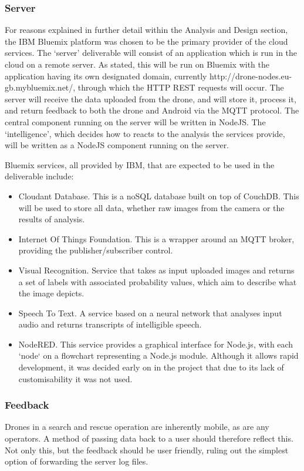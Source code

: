 \documentclass{article}
\begin{document}
\subsubsection{Server}
For reasons explained in further detail within the Analysis and Design section, the IBM Bluemix platform was chosen to be the primary provider of the cloud services. The `server' deliverable will consist of an application which is run in the cloud on a remote server. As stated, this will be run on Bluemix with the application having its own designated domain, currently http://drone-nodes.eu-gb.mybluemix.net/, through which the HTTP REST requests will occur. The server will receive the data uploaded from the drone, and will store it, process it, and return feedback to both the drone and Android via the MQTT protocol. The central component running on the server will be written in NodeJS. The `intelligence', which decides how to reacts to the analysis the services provide, will be written as a NodeJS component running on the server.

Bluemix services, all provided by IBM, that are expected to be used in the deliverable include:
\begin{itemize}
    \item Cloudant Database. This is a noSQL database built on top of CouchDB. This will be used to store all data, whether raw images from the camera or the results of analysis.
    \item Internet Of Things Foundation. This is a wrapper around an MQTT broker, providing the publisher/subscriber control.
    \item Visual Recognition. Service that takes as input uploaded images and returns a set of labels with associated probability values, which aim to describe what the image depicts.
    \item Speech To Text. A service based on a neural network that analyses input audio and returns transcripts of intelligible speech.
    \item NodeRED. This service provides a graphical interface for Node.js, with each `node` on a flowchart representing a Node.js module. Although it allows rapid development, it was decided early on in the project that due to its lack of customisability it was not used. 
\end{itemize}


\subsubsection{Feedback}\label{Feedback}
Drones in a search and rescue operation are inherently mobile, as are any operators. A method of passing data back to a user should therefore reflect this. Not only this, but the feedback should be user friendly, ruling out the simplest option of forwarding the server log files.
\end{document}

